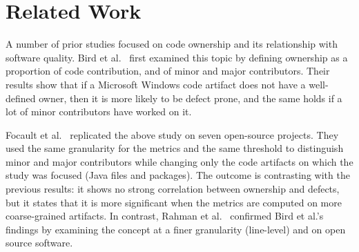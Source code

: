 \section{Related Work}
\label{sec:rel}

A number of prior studies focused on code ownership and its relationship with software quality. Bird et al.~\cite{bird:original} first examined this topic by defining ownership as a proportion of code contribution, and of minor and major contributors. Their results show that if a Microsoft Windows code artifact does not have a well-defined owner, then it is more likely to be defect prone, and the same holds if a lot of minor contributors have worked on it. 

Focault et al.~\cite{Foucault:oss} replicated the above study on seven open-source projects. They used the same granularity for the metrics and the same threshold to distinguish minor and major contributors while changing only the code artifacts on which the study was focused (Java files and packages). The outcome is contrasting with the previous results: it shows no strong correlation between ownership and defects, but it states that it is more significant when the metrics are computed on more coarse-grained artifacts. In contrast, Rahman et al.~\cite{Rahman:blame} confirmed Bird et al.'s findings by examining the concept at a finer granularity (line-level) and on open source software. 




